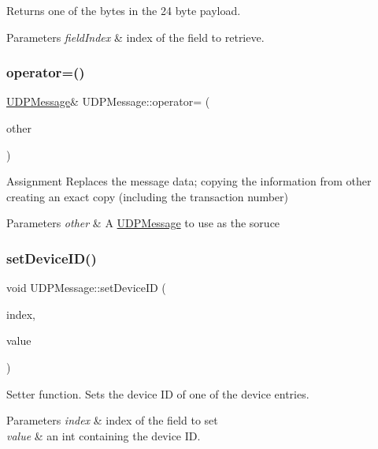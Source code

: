 Returns one of the bytes in the 24 byte payload. 
\begin{DoxyParams}{Parameters}
{\em field\+Index} & index of the field to retrieve. \\
\hline
\end{DoxyParams}
\mbox{\label{class_u_d_p_message_af3bb7f16fec948bcfbf99646b79c5c58}} 
\subsubsection{\texorpdfstring{operator=()}{operator=()}}
{\footnotesize\ttfamily \hyperlink{class_u_d_p_message}{U\+D\+P\+Message}\& U\+D\+P\+Message\+::operator= (\begin{DoxyParamCaption}\item[{const \hyperlink{class_u_d_p_message}{U\+D\+P\+Message} \&}]{other }\end{DoxyParamCaption})\hspace{0.3cm}{\ttfamily [inline]}}

Assignment Replaces the message data; copying the information from other creating an exact copy (including the transaction number) 
\begin{DoxyParams}{Parameters}
{\em other} & A \hyperlink{class_u_d_p_message}{U\+D\+P\+Message} to use as the soruce \\
\hline
\end{DoxyParams}
\mbox{\label{class_u_d_p_message_a9cf9c5e20119a221ee36412e0c1d39c5}} 
\subsubsection{\texorpdfstring{set\+Device\+I\+D()}{setDeviceID()}}
{\footnotesize\ttfamily void U\+D\+P\+Message\+::set\+Device\+ID (\begin{DoxyParamCaption}\item[{unsigned char}]{index,  }\item[{int}]{value }\end{DoxyParamCaption})\hspace{0.3cm}{\ttfamily [inline]}}

Setter function. Sets the device ID of one of the device entries. 
\begin{DoxyParams}{Parameters}
{\em index} & index of the field to set \\
\hline
{\em value} & an int containing the device ID. \\
\hline
\end{DoxyParams}
\mbox{\label{class_u_d_p_message_a2dcad6fc97802808675fb9259727da64}} 
